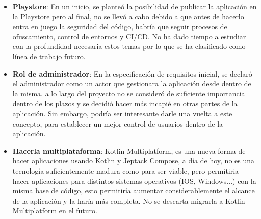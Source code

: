 \begin{itemize}
    \item \textbf{Playstore}: En un inicio, se planteó la posibilidad de publicar la aplicación en la Playstore pero al final, no se llevó a cabo debido a que antes de hacerlo entra en juego la seguridad del código, habría que seguir procesos de ofuscamiento, control de entornos y CI/CD. No ha dado tiempo a estudiar con la profundidad necesaria estos temas por lo que se ha clasificado como línea de trabajo futuro.
    \item \textbf{Rol de administrador}: En la especificación de requisitos inicial, se declaró el administrador como un actor que gestionara la aplicación desde dentro de la misma, a lo largo del proyecto no se consideró de suficiente importancia dentro de los plazos y se decidió hacer más incapié en otras partes de la aplicación. Sin embargo, podría ser interesante darle una vuelta a este concepto, para establecer un mejor control de usuarios dentro de la aplicación.
    \item \textbf{Hacerla multiplataforma}: Kotlin Multiplatform\hyperlink{cap:biblio}{}, es una nueva forma de hacer aplicaciones usando \hyperlink{subsec:kotlin}{Kotlin} y \hyperlink{subsec:compose}{Jeptack Compose}, a día de hoy, no es una tecnología suficientemente madura como para ser viable, pero permitiria hacer aplicaciones para distintos sistemas operativos (IOS, Windows...) con la misma base de código, esto permitiría aumentar considerablemente el alcance de la aplicación y la haría más completa. No se descarta migrarla a Kotlin Multiplatform en el futuro.
\end{itemize}


